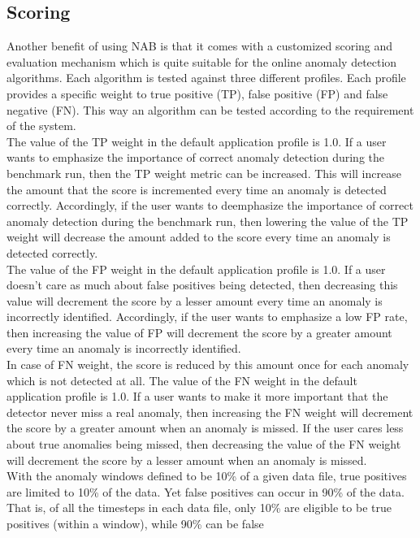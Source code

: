 \documentclass[12pt]{article}
\begin{document}
\subsection{Scoring}
Another benefit of using NAB is that it comes with a customized scoring and evaluation mechanism which is quite suitable for the online anomaly detection algorithms. Each algorithm is tested against three different profiles. Each profile provides a specific weight to true positive (TP), false positive (FP) and false negative (FN). This way an algorithm can be tested according to the requirement of the system.\\
\break
The value of the TP weight in the default application profile is 1.0. If a
user wants to emphasize the importance of correct anomaly detection during the
benchmark run, then the TP weight metric can be increased. This will increase
the amount that the score is incremented every time an anomaly is detected
correctly. Accordingly, if the user wants to deemphasize the importance of
correct anomaly detection during the benchmark run, then lowering the value of
the TP weight will decrease the amount added to the score every time an
anomaly is detected correctly.\\
\break
The value of the FP weight in the default application profile is 1.0. If a user
doesn’t care as much about false positives being detected, then decreasing this
value will decrement the score by a lesser amount every time an anomaly is
incorrectly identified. Accordingly, if the user wants to emphasize a low FP rate,
then increasing the value of FP will decrement the score by a greater amount
every time an anomaly is incorrectly identified.\\
\break
In case of FN weight, the score is reduced by this amount once for each anomaly
which is not detected at all. The value of the FN weight in the default application
profile is 1.0. If a user wants to make it more important that the detector never
miss a real anomaly, then increasing the FN weight will decrement the score by a
greater amount when an anomaly is missed. If the user cares less about true
anomalies being missed, then decreasing the value of the FN weight will
decrement the score by a lesser amount when an anomaly is missed.\\
\break
With the anomaly windows defined to be 10\% of a given data file, true positives are limited to 10\% of the data. Yet false positives can
occur in 90\% of the data. That is, of all the timesteps in each data file, only 10\%
are eligible to be true positives (within a window), while 90\% can be false
\end{document}
